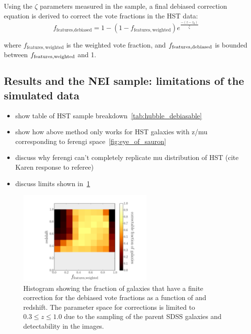 Using the $\zeta$ parameters measured in the \ferengi{} sample, a final debiased correction equation is derived to correct the \ffeatures{} vote fractions in the HST data:
\begin{equation}
f_\textrm{features,debiased} = 1 - (1 - f_\mathrm{features,weighted})e^{\frac{-(z-z_0)}{\hat\zeta}}
\label{eqn:fzeta_mod}
\end{equation}

\noindent where $f_\mathrm{features,weighted}$ is the weighted vote fraction, and $f_{\rm features,debiased}$ is bounded 
between $f_{\rm features,weighted}$ and 1. 



\subsection{Results and the NEI sample: limitations of the \ferengi{} simulated data}


\begin{itemize}
\item show table of HST sample breakdown~\ref{tab:hubble_debiasable}
\item show how above method only works for HST galaxies with z/mu corresponding to ferengi space~\ref{fig:eye_of_sauron}
\item discuss why ferengi can't completely replicate mu distribution of HST (cite Karen response to referee) 
\item discuss limits shown in~\ref{fig:correctable_fraction}
\end{itemize}

\begin{figure}
\center
\includegraphics[width=0.6\textwidth]{figures/correctable_fraction.pdf}
\caption{Histogram showing the fraction of galaxies that have a finite correction
for the debiased vote fractions \ffeaturesdebiased{} as a function of \ffeatures{}
and redshift. The parameter space for corrections is limited to $0.3 \leq z \leq 1.0$
due to the sampling of the parent SDSS galaxies and detectability in the \ferengi{} images.
}
\label{fig:correctable_fraction}
\end{figure}

